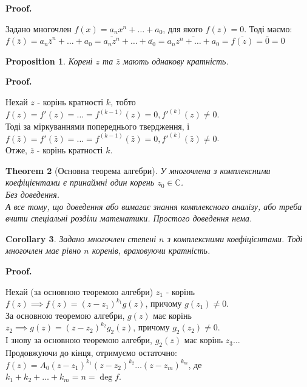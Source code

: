 \documentclass[a4paper, 10pt]{extarticle}
\makeatletter
\def\qed{$\blacksquare$}
\def\qed{$\blacksquare$}
\theoremstyle{theoremdd}
\newtheorem{theorem}{Theorem}[subsection]
\theoremstyle{theoremdd}
\theoremstyle{theoremdd}
\theoremstyle{theoremdd}
\theoremstyle{theoremdd}
\newtheorem{proposition}[theorem]{Proposition}
\theoremstyle{theoremdd}
\theoremstyle{theoremdd}
\theoremstyle{theoremdd}
\newtheorem{corollary}[theorem]{Corollary}
\renewenvironment{proof}[1][Proof.\\]{\par
\pushQED{\hfill \qed}%
\normalfont \topsep6\p@\@plus6\p@\relax
\trivlist
\item\relax
{\bfseries
#1\@addpunct{.}}\hspace\labelsep\ignorespaces
}{%
\popQED\endtrivlist\@endpefalse
}
\makeatother
\begin{document}
\begin{proof}
Задано многочлен $f(x) = a_n x^n + \dots + a_0$, для якого $f(z) = 0$. Тоді маємо:\\
$f(\bar{z}) = a_n \bar{z}^n + \dots + a_0 = \overline{a_n z^n} + \dots + \overline{a_0} = \overline{a_n z^n + \dots + a_0} = \overline{f(z)} = \bar{0} = 0$
\end{proof}

\begin{proposition}
Корені $z$ та $\bar{z}$ мають однакову кратність.
\end{proposition}

\begin{proof}
Нехай $z$ - корінь кратності $k$, тобто $f(z) = f'(z) = \dots = f^{(k-1)}(z) = 0, f'^{(k)}(z) \neq 0$.\\
Тоді за міркуваннями попереднього твердження, і$f(\bar{z}) = f'(\bar{z}) = \dots = f^{(k-1)}(\bar{z}) = 0, f'^{(k)}(\bar{z}) \neq 0$. \\ Отже, $\bar{z}$ - корінь кратності $k$.
\end{proof}

\begin{theorem}[Основна теорема алгебри]
У многочлена з комплексними коефіцієнтами є принаймні один корень $z_0 \in \mathbb{C}$.\\
\textit{Без доведення.}\\
\textit{А все тому, що доведення або вимагає знання комплексного аналізу, або треба вчити спеціальні розділи математики. Простого доведення нема.}
\end{theorem}

\begin{corollary}
Задано многочлен степені $n$ з комплексними коефіцієнтами. Тоді многочлен має рівно $n$ коренів, враховуючи кратність.
\end{corollary}

\begin{proof}
Нехай (за основною теоремою алгебри) $z_1$ - корінь $f(z) \implies f(z) = (z-z_1)^{k_1} g(z)$, причому $g(z_1) \neq 0$.\\
За основною теоремою алгебри, $g(z)$ має корінь $z_2 \implies g(z) = (z-z_2)^{k_2} g_2(z)$, причому $g_2(z_2) \neq 0$.\\
І знову за основною теоремою алгебри, $g_2(z)$ має корінь $z_3\dots$\\
Продовжуючи до кінця, отримуємо остаточно:\\
$f(z) = A_0(z-z_1)^{k_1}(z-z_2)^{k_2}\dots(z-z_m)^{k_m}$, де \hspace{0.5cm} $k_1 + k_2 + \dots + k_m = n = \deg f$.
\end{proof}
\end{document}
